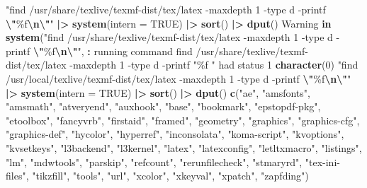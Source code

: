 \documentclass[
]{article}
\newenvironment{Shaded}{\begin{snugshade}}{\end{snugshade}}
\newcommand{\AttributeTok}[1]{\textcolor[rgb]{0.13,0.29,0.53}{#1}}
\newcommand{\ConstantTok}[1]{\textcolor[rgb]{0.56,0.35,0.01}{#1}}
\newcommand{\ControlFlowTok}[1]{\textcolor[rgb]{0.13,0.29,0.53}{\textbf{#1}}}
\newcommand{\DecValTok}[1]{\textcolor[rgb]{0.00,0.00,0.81}{#1}}
\newcommand{\FunctionTok}[1]{\textcolor[rgb]{0.13,0.29,0.53}{\textbf{#1}}}
\newcommand{\NormalTok}[1]{#1}
\newcommand{\SpecialCharTok}[1]{\textcolor[rgb]{0.81,0.36,0.00}{\textbf{#1}}}
\newcommand{\StringTok}[1]{\textcolor[rgb]{0.31,0.60,0.02}{#1}}
\begin{document}
\begin{Shaded}
\begin{Highlighting}[]
\StringTok{"find /usr/share/texlive/texmf{-}dist/tex/latex {-}maxdepth 1 {-}type d {-}printf }\SpecialCharTok{\textbackslash{}"}\StringTok{\%f}\SpecialCharTok{\textbackslash{}n\textbackslash{}"}\StringTok{"} \SpecialCharTok{|\textgreater{}}
    \FunctionTok{system}\NormalTok{(}\AttributeTok{intern =} \ConstantTok{TRUE}\NormalTok{) }\SpecialCharTok{|\textgreater{}}
    \FunctionTok{sort}\NormalTok{() }\SpecialCharTok{|\textgreater{}}
    \FunctionTok{dput}\NormalTok{()}
\NormalTok{Warning }\ControlFlowTok{in} \FunctionTok{system}\NormalTok{(}\StringTok{"find /usr/share/texlive/texmf{-}dist/tex/latex {-}maxdepth 1 {-}type d {-}printf }\SpecialCharTok{\textbackslash{}"}\StringTok{\%f}\SpecialCharTok{\textbackslash{}n\textbackslash{}"}\StringTok{"}\NormalTok{, }\SpecialCharTok{:}\NormalTok{ running command }\StringTok{\textquotesingle{}find /usr/share/texlive/texmf{-}dist/tex/latex {-}maxdepth 1 {-}type d {-}printf "\%f}
\StringTok{"\textquotesingle{}}\NormalTok{ had status }\DecValTok{1}
\FunctionTok{character}\NormalTok{(}\DecValTok{0}\NormalTok{)}
\StringTok{"find /usr/local/texlive/texmf{-}dist/tex/latex {-}maxdepth 1 {-}type d {-}printf }\SpecialCharTok{\textbackslash{}"}\StringTok{\%f}\SpecialCharTok{\textbackslash{}n\textbackslash{}"}\StringTok{"} \SpecialCharTok{|\textgreater{}}
    \FunctionTok{system}\NormalTok{(}\AttributeTok{intern =} \ConstantTok{TRUE}\NormalTok{) }\SpecialCharTok{|\textgreater{}}
    \FunctionTok{sort}\NormalTok{() }\SpecialCharTok{|\textgreater{}}
    \FunctionTok{dput}\NormalTok{()}
\FunctionTok{c}\NormalTok{(}\StringTok{"ae"}\NormalTok{, }\StringTok{"amsfonts"}\NormalTok{, }\StringTok{"amsmath"}\NormalTok{, }\StringTok{"atveryend"}\NormalTok{, }\StringTok{"auxhook"}\NormalTok{, }\StringTok{"base"}\NormalTok{, }
\StringTok{"bookmark"}\NormalTok{, }\StringTok{"epstopdf{-}pkg"}\NormalTok{, }\StringTok{"etoolbox"}\NormalTok{, }\StringTok{"fancyvrb"}\NormalTok{, }\StringTok{"firstaid"}\NormalTok{, }
\StringTok{"framed"}\NormalTok{, }\StringTok{"geometry"}\NormalTok{, }\StringTok{"graphics"}\NormalTok{, }\StringTok{"graphics{-}cfg"}\NormalTok{, }\StringTok{"graphics{-}def"}\NormalTok{, }
\StringTok{"hycolor"}\NormalTok{, }\StringTok{"hyperref"}\NormalTok{, }\StringTok{"inconsolata"}\NormalTok{, }\StringTok{"koma{-}script"}\NormalTok{, }\StringTok{"kvoptions"}\NormalTok{, }
\StringTok{"kvsetkeys"}\NormalTok{, }\StringTok{"l3backend"}\NormalTok{, }\StringTok{"l3kernel"}\NormalTok{, }\StringTok{"latex"}\NormalTok{, }\StringTok{"latexconfig"}\NormalTok{, }
\StringTok{"letltxmacro"}\NormalTok{, }\StringTok{"listings"}\NormalTok{, }\StringTok{"lm"}\NormalTok{, }\StringTok{"mdwtools"}\NormalTok{, }\StringTok{"parskip"}\NormalTok{, }\StringTok{"refcount"}\NormalTok{, }
\StringTok{"rerunfilecheck"}\NormalTok{, }\StringTok{"stmaryrd"}\NormalTok{, }\StringTok{"tex{-}ini{-}files"}\NormalTok{, }\StringTok{"tikzfill"}\NormalTok{, }\StringTok{"tools"}\NormalTok{, }
\StringTok{"url"}\NormalTok{, }\StringTok{"xcolor"}\NormalTok{, }\StringTok{"xkeyval"}\NormalTok{, }\StringTok{"xpatch"}\NormalTok{, }\StringTok{"zapfding"}\NormalTok{)}
\end{Highlighting}
\end{Shaded}
\end{document}
